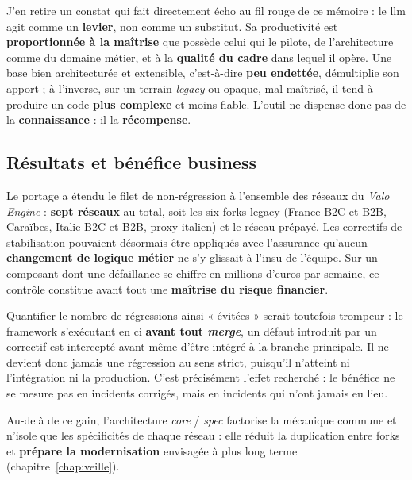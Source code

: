 J'en retire un constat qui fait directement écho au fil rouge de ce mémoire : le
\gls{llm} agit comme un \textbf{levier}, non comme un substitut. Sa productivité
est \textbf{proportionnée à la maîtrise} que possède celui qui le pilote, de
l'architecture comme du domaine métier, et à la \textbf{qualité du cadre} dans
lequel il opère. Une base bien architecturée et extensible, c'est-à-dire \textbf{peu
endettée}, démultiplie son apport ; à l'inverse, sur un terrain \emph{legacy} ou
opaque, mal maîtrisé, il tend à produire un code \textbf{plus complexe} et moins
fiable. L'outil ne dispense donc pas de la \textbf{connaissance} : il la
\textbf{récompense}.

\subsection{Résultats et bénéfice business}
Le portage a étendu le filet de non-régression à l'ensemble des réseaux du
\emph{Valo Engine} : \textbf{sept réseaux} au total, soit les six forks legacy
(France B2C et B2B, Caraïbes, Italie B2C et B2B, proxy italien) et le réseau
prépayé. Les correctifs de stabilisation pouvaient désormais être appliqués
avec l'assurance qu'aucun \textbf{changement de logique métier} ne s'y glissait à
l'insu de l'équipe. Sur un composant dont une défaillance se chiffre en millions
d'euros par semaine, ce contrôle constitue avant tout une \textbf{maîtrise du
risque financier}.

Quantifier le nombre de régressions ainsi « évitées » serait toutefois trompeur :
le framework s'exécutant en \gls{ci} \textbf{avant tout \emph{merge}}, un défaut
introduit par un correctif est intercepté avant même d'être intégré à la branche
principale. Il ne devient donc jamais une régression au sens strict, puisqu'il
n'atteint ni l'intégration ni la production. C'est précisément l'effet recherché :
le bénéfice ne se mesure pas en incidents corrigés, mais en incidents qui n'ont
jamais eu lieu.

Au-delà de ce gain, l'architecture \emph{core} / \emph{spec} factorise la
mécanique commune et n'isole que les spécificités de chaque réseau : elle réduit
la duplication entre forks et \textbf{prépare la modernisation} envisagée à plus
long terme (chapitre~\ref{chap:veille}).
